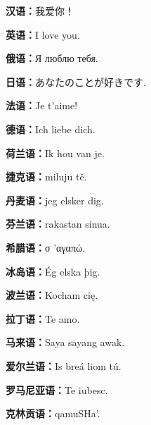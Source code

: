 \documentclass{thesis_demo}
\begin{document}
	
	\textbf{汉语：}我爱你！
	
	\textbf{英语：}I love you.
	
	\textbf{俄语：}Я люблю тебя. 	
	
	\textbf{日语：}あなたのことが好きです.
	
	\textbf{法语：}Je t'aime!

	\textbf{德语：}Ich liebe dich.
	
	\textbf{荷兰语：}Ik hou van je.
	
	\textbf{捷克语：}miluju tě.
	
	\textbf{丹麦语：}jeg elsker dig.
	
	\textbf{芬兰语：}rakastan sinua.
	
	\textbf{希腊语：}σ 'αγαπώ.
	
	\textbf{冰岛语：}Ég elska þig.
	
	\textbf{波兰语：}Kocham cię.
	
	\textbf{拉丁语：}Te amo.
	
	\textbf{马来语：}Saya sayang awak.
		
	\textbf{爱尔兰语：}Is breá liom tú.
	
	\textbf{罗马尼亚语：}Te iubesc.
	
	\textbf{克林贡语：}qamuSHa'.
\end{document}
